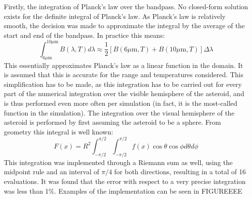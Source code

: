 Firstly, the integration of Planck's law over the bandpass. No closed-form solution exists for the definite integral of Planck's law. As Planck's law is relatively smooth, the decision was made to approximate the integral by the average of the start and end of the bandpass. In practice this means:
\begin{equation}
 \int _{6 \mu\mathrm{m}}^{10 \mu\mathrm{m}} B(\lambda, T) d\lambda \approx \frac{1}{2}\left[B(6 \mu\mathrm{m}, T) + B(10 \mu\mathrm{m}, T)\right] \Delta \lambda
\end{equation}
This essentially approximates Planck's law as a linear function in the domain. It is assumed that this is accurate for the range and temperatures considered. This simplification has to be made, as this integration has to be carried out for every part of the numerical integration over the visible hemisphere of the asteroid, and is thus performed even more often per simulation (in fact, it is the most-called function in the simulation). The integration over the visual hemisphere of the asteroid is performed by first assuming the asteroid to be a sphere. From geometry this integral is well known:
\begin{equation}
 F(x) = R^2\int_{-\pi/2}^{\pi/2}\int_{-\pi/2}^{\pi/2} f(x) \cos \theta \cos \phi d \theta d \phi
\end{equation}
This integration was implemented through a Riemann sum as well, using the midpoint rule and an interval of $\pi/4$ for both directions, resulting in a total of 16 evaluations. It was found that the error with respect to a very precise integration was less than 1\%. Examples of the implementation can be seen in FIGUREEEE



